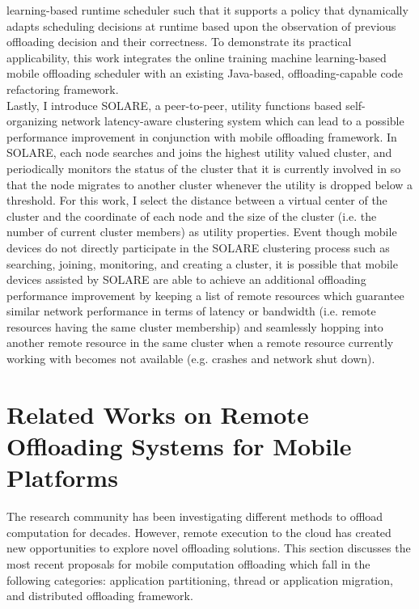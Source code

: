 learning-based runtime scheduler such that it supports a policy that
dynamically adapts scheduling decisions at runtime based upon the
observation of previous offloading decision and their correctness.
%
To demonstrate its practical applicability, this work integrates the
online training machine learning-based mobile offloading scheduler with
an existing Java-based, offloading-capable code refactoring framework.\\ 
%
Lastly, I introduce SOLARE, a peer-to-peer, utility functions based
self-organizing network latency-aware clustering system which can lead
to a possible performance improvement in conjunction with mobile
offloading framework.
%
In SOLARE, each node searches and joins the highest utility valued
cluster, and periodically monitors the status of the cluster that it is
currently involved in so that the node migrates to another cluster
whenever the utility is dropped below a threshold.
%
For this work, I select the distance between a virtual center of the
cluster and the coordinate of each node and the size of the cluster
(i.e. the number of current cluster members) as utility properties.
%
Event though mobile devices do not directly participate in the SOLARE
clustering process such as searching, joining, monitoring, and creating
a cluster, it is possible that mobile devices assisted by SOLARE
are able to achieve an additional offloading performance improvement by
keeping a list of remote resources which guarantee similar network
performance in terms of latency or bandwidth (i.e. remote resources
having the same cluster membership) and seamlessly hopping into another
remote resource in the same cluster when a remote resource currently
working with becomes not available (e.g. crashes and network shut down).

\section{Related Works on Remote Offloading Systems for Mobile Platforms}
\label{intro:relatedwork}

The research community has been investigating different methods to
offload computation for decades.
%
However, remote execution to the cloud has created new opportunities to
explore novel offloading solutions.
%
This section discusses the most recent proposals for mobile computation
offloading which fall in the following categories: application
partitioning, thread or application migration, and distributed
offloading framework.
%
